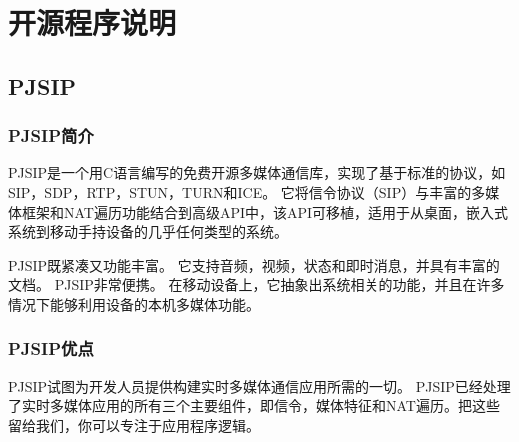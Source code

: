 \documentclass[a4paper,AutoFakeBold,oneside,12pt]{book}
\begin{document}

\chapter{开源程序说明}
\section{PJSIP}
\subsection{PJSIP简介}
PJSIP\cite{webster_pjsip}是一个用C语言编写的免费开源多媒体通信库，实现了基于标准的协议，如SIP，SDP，RTP，STUN，TURN和ICE。 它将信令协议（SIP）与丰富的多媒体框架和NAT遍历功能结合到高级API中，该API可移植，适用于从桌面，嵌入式系统到移动手持设备的几乎任何类型的系统。

PJSIP既紧凑又功能丰富。 它支持音频，视频，状态和即时消息，并具有丰富的文档。 PJSIP非常便携。 在移动设备上，它抽象出系统相关的功能，并且在许多情况下能够利用设备的本机多媒体功能。

\subsection{PJSIP优点}

PJSIP试图为开发人员提供构建实时多媒体通信应用所需的一切。 PJSIP已经处理了实时多媒体应用的所有三个主要组件，即信令，媒体特征和NAT遍历。把这些留给我们，你可以专注于应用程序逻辑。
\end{document}

